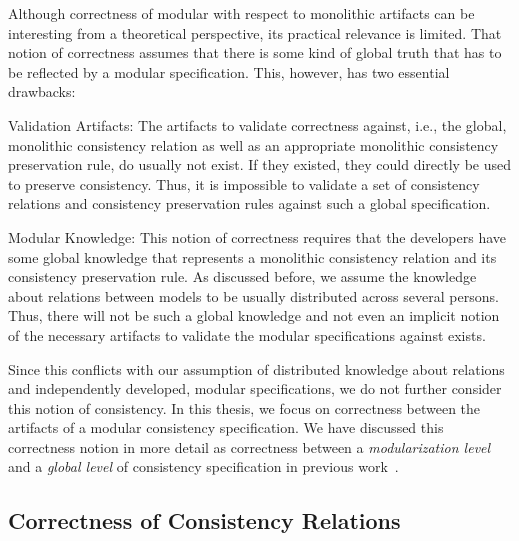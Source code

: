 Although correctness of modular with respect to monolithic artifacts can be interesting from a theoretical perspective, its practical relevance is limited.
That notion of correctness assumes that there is some kind of global truth that has to be reflected by a modular specification.
This, however, has two essential drawbacks:
\begin{properdescription}
    \item[Validation Artifacts:] The artifacts to validate correctness against, i.e., the global, monolithic consistency relation as well as an appropriate monolithic consistency preservation rule, do usually not exist. If they existed, they could directly be used to preserve consistency. Thus, it is impossible to validate a set of consistency relations and consistency preservation rules against such a global specification.
    \item[Modular Knowledge:] This notion of correctness requires that the developers have some global knowledge that represents a monolithic consistency relation and its consistency preservation rule. As discussed before, we assume  the knowledge about relations between models to be usually distributed across several persons. Thus, there will not be such a global knowledge and not even an implicit notion of the necessary artifacts to validate the modular specifications against exists. %
\end{properdescription}
%
Since this conflicts with our assumption of distributed knowledge about relations and independently developed, modular specifications, we do not further consider this notion of consistency.
In this thesis, we focus on correctness between the artifacts of a modular consistency specification.
We have discussed this correctness notion in more detail as correctness between a \emph{modularization level} and a \emph{global level} of consistency specification in previous work~.


\subsection{Correctness of Consistency Relations}
\label{chap:correctness:notions_correctness:relations}

